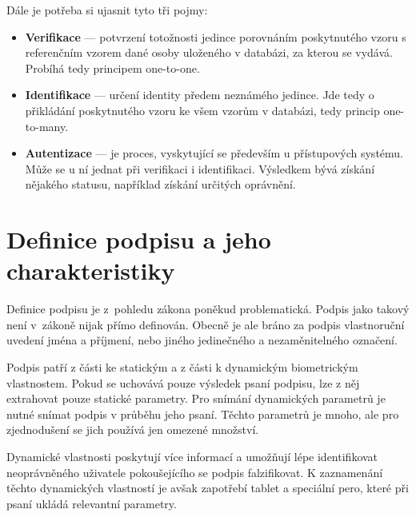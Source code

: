 Dále je potřeba si ujasnit tyto tři pojmy:
\begin{itemize}
  \item \textbf{Verifikace} --- potvrzení totožnosti jedince porovnáním poskytnutého vzoru s referenčním vzorem dané osoby uloženého v databázi, %
  za kterou se vydává. Probíhá tedy principem one-to-one.                                                                                     %
  \item \textbf{Identifikace} --- určení identity předem neznámého jedince.                                                                       %
  Jde tedy o přikládání poskytnutého vzoru ke všem vzorům v databázi, tedy princip one-to-many.                                                %
  \item \textbf{Autentizace} --- je proces, vyskytující se především u přístupových systému.                                                      %
  Může se u ní jednat při verifikaci i identifikaci.                                                                                            %
  Výsledkem bývá získání nějakého statusu, například získání určitých oprávnění.~\cite{Scurek2015}                                                        %
\end{itemize}


\section{Definice podpisu a jeho charakteristiky}
Definice podpisu je z~pohledu zákona poněkud problematická. 
Podpis jako takový není v~zákoně nijak přímo definován. 
Obecně je ale bráno za podpis vlastnoruční uvedení jména a příjmení, nebo jiného jedinečného a nezaměnitelného označení.~\cite{Fulsoft2023} %

Podpis patří z části ke statickým a z části k dynamickým biometrickým vlastnostem.
Pokud se uchovává pouze výsledek psaní podpisu, lze z něj extrahovat pouze statické parametry.
Pro snímání dynamických parametrů je nutné snímat podpis v průběhu jeho psaní.
Těchto parametrů je mnoho, ale pro zjednodušení se jich používá jen omezené množství.

Dynamické vlastnosti poskytují více informací a umožňují lépe identifikovat neoprávněného uživatele pokoušejícího se podpis falzifikovat.    %
K zaznamenání těchto dynamických vlastností je avšak zapotřebí tablet a speciální pero, které při psaní ukládá relevantní parametry.~\cite{DrahanskýMartin2011}  %

